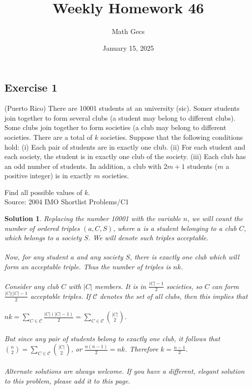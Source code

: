 \documentclass[12pt]{article}
\title{Weekly Homework 46}
\author{Math Gecs}
\date{January 15, 2025}
\newtheorem*{solution*}{Solution}
\begin{document}
\maketitle

\subsection*{Exercise 1}
(Puerto Rico) There are 10001 students at an university (sic). Somer students join together to form several clubs (a student may belong to different clubs). Some clubs join together to form societies (a club may belong to different societies. There are a total of $\displaystyle k$ societies. Suppose that the following conditions hold:
(i) Each pair of students are in exactly one club.
(ii) For each student and each society, the student is in exactly one club of the society.
(iii) Each club has an odd number of students. In addition, a club with $\displaystyle 2m+1$ students ($\displaystyle m$ a positive integer) is in exactly $\displaystyle m$ societies.

Find all possible values of $\displaystyle k$.\\

Source: 2004 IMO Shortlist Problems/C1

\begin{solution*}
Replacing the number 10001 with the variable $\displaystyle n$, we will count the number of ordered triples $\displaystyle (a,C,S)$, where $\displaystyle a$ is a student belonging to a club $\displaystyle {} C$, which belongs to a society $\displaystyle S$. We will denote such triples acceptable.
\\ \\
Now, for any student $\displaystyle a$ and any society $\displaystyle S$, there is exactly one club which will form an acceptable triple. Thus the number of triples is $\displaystyle nk$.
\\ \\
Consider any club $\displaystyle {} C$ with $\displaystyle |C|$ members. It is in $\frac{|C| -1}{2}$ societies, so $\displaystyle {} C$ can form $\frac{|C|(|C|-1}{2}$ acceptable triples. If $\mathcal{C}$ denotes the set of all clubs, then this implies that
\\ \\
$nk = \sum_{C \in \mathcal{C}} \frac{|C|(|C|-1)}{2} = \sum_{C \in \mathcal{C}} {|C| \choose 2}$.
\\ \\
But since any pair of students belong to exactly one club, it follows that ${n \choose 2} = \sum_{C \in \mathcal{C}} {|C| \choose 2}$, or $\frac{n(n-1)}{2} = nk$. Therefore $k = \frac{n-1}{2}$.
\\ \\
Alternate solutions are always welcome. If you have a different, elegant solution to this problem, please add it to this page.
\end{solution*}
\end{document}
